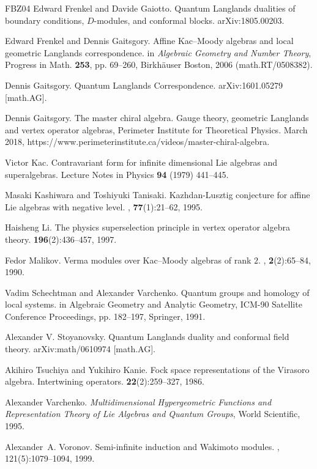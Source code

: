 \documentclass{amsart}
\newcommand{\+}{\mathop{\oplus}}
\renewcommand{\*}{{\otimes}}
\theoremstyle{theorem}
\theoremstyle{remark}
\numberwithin{equation}{section}
\begin{document}
\begin{thebibliography}{FBZ04}
Edward Frenkel and Davide Gaiotto.
\newblock Quantum Langlands dualities of boundary conditions,
$D$-modules, and conformal blocks.
\newblock arXiv:1805.00203.

Edward Frenkel and Dennis Gaitsgory.
\newblock Affine Kac--Moody algebras and local geometric Langlands
correspondence.
\newblock in {\em Algebraic Geometry
and Number Theory}, Progress in Math. {\bf 253}, pp. 69--260,
Birkh\"auser Boston, 2006 (math.RT/0508382).

Dennis Gaitsgory.
\newblock Quantum Langlands Correspondence.
\newblock  	arXiv:1601.05279 [math.AG].
  
Dennis Gaitsgory.
\newblock The master chiral algebra.
\newblock  Gauge theory, geometric Langlands and vertex operator
  algebras, {P}erimeter {I}nstitute for {T}heoretical {P}hysics.
  March 2018, 
  https://www.perimeterinstitute.ca/videos/master-chiral-algebra.

 Victor Kac.
\newblock  Contravariant form for infinite dimensional Lie algebras
and superalgebras.
\newblock Lecture Notes in Physics {\bf 94} (1979) 441--445.

\newblock  Masaki Kashiwara and Toshiyuki Tanisaki.
\newblock Kazhdan-{L}usztig conjecture for affine {L}ie algebras with negative level.
, {\bf 77}(1):21--62, 1995.

Haisheng Li.
\newblock The physics superselection principle in vertex operator algebra
  theory.
 {\bf 196}(2):436--457, 1997.

Fedor Malikov.
\newblock  Verma modules over {K}ac--{M}oody algebras of rank {$2$}.
, {\bf 2}(2):65--84,
1990.

 Vadim  Schechtman and Alexander Varchenko.
Quantum groups and homology of local systems.
in Algebraic Geometry and Analytic Geometry, ICM-90 Satellite
Conference Proceedings, pp. 182--197, Springer, 1991.

Alexander V. Stoyanovsky.
Quantum Langlands duality and conformal field theory.
arXiv:math/0610974 [math.AG].


Akihiro Tsuchiya and Yukihiro Kanie.
\newblock Fock space representations of the {V}irasoro
algebra. {I}ntertwining operators.
 {\bf 22}(2):259--327, 1986.

 Alexander Varchenko.  {\em Multidimensional
    Hypergeometric Functions and Representation Theory of Lie Algebras
    and Quantum Groups}, World Scientific, 1995.

Alexander~A. Voronov.
\newblock Semi-infinite induction and {W}akimoto modules.
, 121(5):1079--1094, 1999.

\end{thebibliography}
\end{document}
